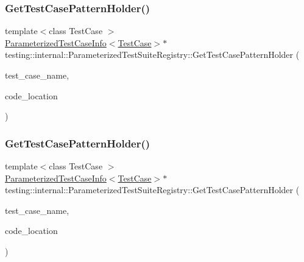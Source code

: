 \subsubsection{\texorpdfstring{GetTestCasePatternHolder()}{GetTestCasePatternHolder()}\hspace{0.1cm}{\footnotesize\ttfamily [1/2]}}
{\footnotesize\ttfamily template$<$class Test\+Case $>$ \\
\mbox{\hyperlink{classtesting_1_1internal_1_1_parameterized_test_case_info}{Parameterized\+Test\+Case\+Info}}$<$\mbox{\hyperlink{classtesting_1_1_test_case}{Test\+Case}}$>$$\ast$ testing\+::internal\+::\+Parameterized\+Test\+Suite\+Registry\+::\+Get\+Test\+Case\+Pattern\+Holder (\begin{DoxyParamCaption}\item[{const char $\ast$}]{test\+\_\+case\+\_\+name,  }\item[{\mbox{\hyperlink{structtesting_1_1internal_1_1_code_location}{Code\+Location}}}]{code\+\_\+location }\end{DoxyParamCaption})\hspace{0.3cm}{\ttfamily [inline]}}

\mbox{\label{classtesting_1_1internal_1_1_parameterized_test_suite_registry_a3fe06fb4e1b4194dae1fbcdf3560fbd3}} 
\subsubsection{\texorpdfstring{GetTestCasePatternHolder()}{GetTestCasePatternHolder()}\hspace{0.1cm}{\footnotesize\ttfamily [2/2]}}
{\footnotesize\ttfamily template$<$class Test\+Case $>$ \\
\mbox{\hyperlink{classtesting_1_1internal_1_1_parameterized_test_case_info}{Parameterized\+Test\+Case\+Info}}$<$\mbox{\hyperlink{classtesting_1_1_test_case}{Test\+Case}}$>$$\ast$ testing\+::internal\+::\+Parameterized\+Test\+Suite\+Registry\+::\+Get\+Test\+Case\+Pattern\+Holder (\begin{DoxyParamCaption}\item[{const char $\ast$}]{test\+\_\+case\+\_\+name,  }\item[{\mbox{\hyperlink{structtesting_1_1internal_1_1_code_location}{Code\+Location}}}]{code\+\_\+location }\end{DoxyParamCaption})\hspace{0.3cm}{\ttfamily [inline]}}


